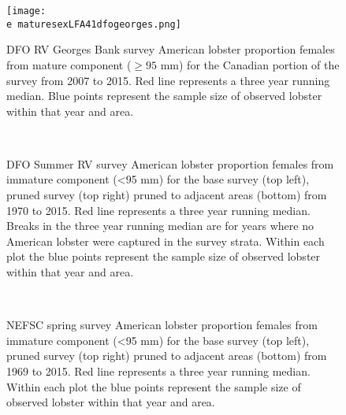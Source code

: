\documentclass[11pt]{article}
\newcommand{\e}{/backup/bio_data/bio.lobster/figures/} %
\begin{document}
\begin{figure}

    \texttt{[image: \\e maturesexLFA41dfogeorges.png]}
    \caption{DFO RV Georges Bank survey American lobster proportion females from mature component ($ \ge 95$ mm) for the Canadian portion of the survey from 2007 to 2015. Red line represents a three year running median. Blue points represent the sample size of observed lobster within that year and area.}

\end{figure}


\begin{figure}
\centering
{}
\\
\caption{DFO Summer RV survey American lobster proportion females from immature component (\textless 95 mm) for the base survey (top left), pruned survey (top right) pruned to adjacent areas (bottom) from 1970 to 2015. Red line represents a three year running median. Breaks in the three year running median are for years where no American lobster were captured in the survey strata. Within each plot the blue points represent the sample size of observed lobster within that year and area.}
\end{figure}
\clearpage


\begin{figure}
\centering
{}
\\
\caption{NEFSC spring survey American lobster proportion females from immature component (\textless 95 mm) for the base survey (top left), pruned survey (top right) pruned to adjacent areas (bottom) from 1969 to 2015. Red line represents a three year running median. Within each plot the blue points represent the sample size of observed lobster within that year and area. }
\end{figure}
\clearpage
\end{document}
